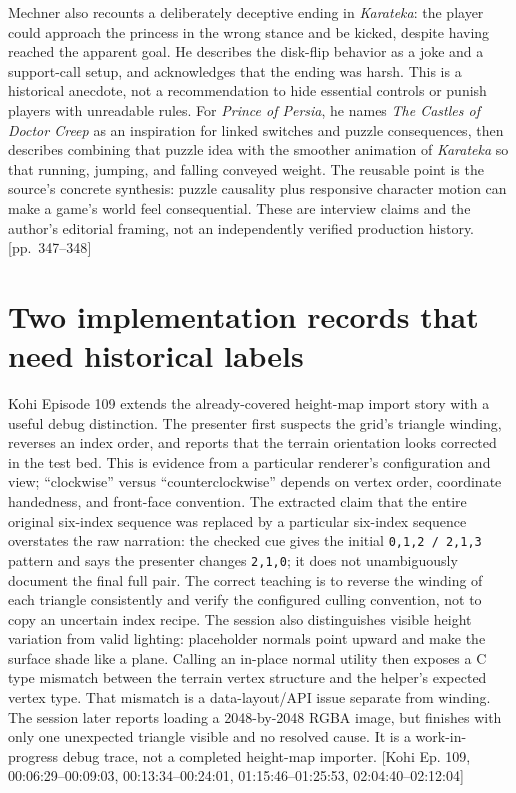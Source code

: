 Mechner also recounts a deliberately deceptive ending in \emph{Karateka}: the player could approach the princess in the wrong stance and be kicked, despite having reached the apparent goal. He describes the disk-flip behavior as a joke and a support-call setup, and acknowledges that the ending was harsh. This is a historical anecdote, not a recommendation to hide essential controls or punish players with unreadable rules. For \emph{Prince of Persia}, he names \emph{The Castles of Doctor Creep} as an inspiration for linked switches and puzzle consequences, then describes combining that puzzle idea with the smoother animation of \emph{Karateka} so that running, jumping, and falling conveyed weight. The reusable point is the source's concrete synthesis: puzzle causality plus responsive character motion can make a game's world feel consequential. These are interview claims and the author's editorial framing, not an independently verified production history. {[}pp.~347--348{]}

\section{Two implementation records that need historical labels}\label{06-engine-ii-ch046-two-implementation-records-that-need-historical-labels}

Kohi Episode 109 extends the already-covered height-map import story with a useful debug distinction. The presenter first suspects the grid's triangle winding, reverses an index order, and reports that the terrain orientation looks corrected in the test bed. This is evidence from a particular renderer's configuration and view; ``clockwise'' versus ``counterclockwise'' depends on vertex order, coordinate handedness, and front-face convention. The extracted claim that the entire original six-index sequence was replaced by a particular six-index sequence overstates the raw narration: the checked cue gives the initial \texttt{0,1,2\ /\ 2,1,3} pattern and says the presenter changes \texttt{2,1,0}; it does not unambiguously document the final full pair. The correct teaching is to reverse the winding of each triangle consistently and verify the configured culling convention, not to copy an uncertain index recipe. The session also distinguishes visible height variation from valid lighting: placeholder normals point upward and make the surface shade like a plane. Calling an in-place normal utility then exposes a C type mismatch between the terrain vertex structure and the helper's expected vertex type. That mismatch is a data-layout/API issue separate from winding. The session later reports loading a 2048-by-2048 RGBA image, but finishes with only one unexpected triangle visible and no resolved cause. It is a work-in-progress debug trace, not a completed height-map importer. {[}Kohi Ep. 109, 00:06:29--00:09:03, 00:13:34--00:24:01, 01:15:46--01:25:53, 02:04:40--02:12:04{]}


